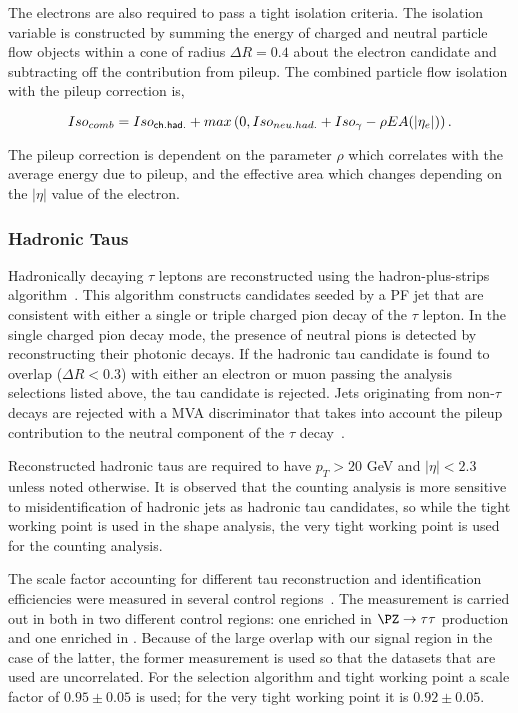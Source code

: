 \noindent
The electrons are also required to pass a tight isolation criteria. The
isolation variable is constructed by summing the energy of charged and neutral
particle flow objects within a cone of radius $\Delta R = 0.4$ about the
electron candidate and subtracting off the
contribution from pileup.  The combined particle flow isolation with the
pileup correction is,

\begin{equation}
    Iso_{comb} = Iso_{\sf ch. had.} + max\left(0, Iso_{neu. had.} +
    Iso_{\gamma} - \rho EA(|\eta_{e}|) \right).
\end{equation}

The pileup correction is dependent on the parameter $\rho$ which
correlates with the average energy due to pileup, and the effective area
which changes depending on the $|\eta|$ value of the electron.

\FloatBarrier
\subsubsection{Hadronic Taus}
\label{sec:taus}

Hadronically decaying $\tau$ leptons are reconstructed using the
hadron-plus-strips algorithm~\cite{ref:cms-tau}.  This algorithm
constructs candidates seeded by a PF jet that are consistent with either
a single or triple charged pion decay of the $\tau$ lepton.  In the
single charged pion decay mode, the presence of neutral pions is
detected by reconstructing their photonic decays.  If the hadronic tau
candidate is found to overlap ($\Delta R < 0.3$) with either an electron
or muon passing the analysis selections listed above, the tau candidate
is rejected.  Jets originating from non-$\tau$ decays are rejected with
a MVA discriminator that takes into account the pileup contribution to the
neutral component of the $\tau$ decay~\cite{CMS-TAU-16-003-001}.  

Reconstructed hadronic taus are required to have $p_{T} > 20$ GeV and
$|\eta| < 2.3$ unless noted otherwise.  It is
observed that the counting analysis is more sensitive to
misidentification of hadronic jets as hadronic tau candidates, so while
the tight working point is used in the shape analysis, the very tight
working point is used for the counting analysis.

The scale factor accounting for different tau reconstruction and
identification efficiencies were measured in several control
regions~\cite{CMS-TAU-16-003-001}.  The measurement is carried out in
both in two different control regions: one enriched in $\PZ\to\tau\tau$
production and one enriched in \ttbar.  Because of the large overlap
with our signal region in the case of the latter, the former measurement
is used so that the datasets that are used are uncorrelated.  For the
selection algorithm and tight working point a scale factor of
$0.95 \pm 0.05$ is used; for the very tight working point it is $0.92
\pm 0.05$.

